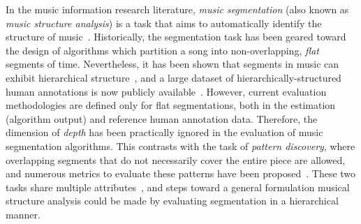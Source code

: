 \documentclass{article}
\begin{document}
In the music information research literature, \emph{music segmentation} (also known as \emph{music structure analysis}) is a task that aims to automatically identify the structure of music~\cite{Paulus2010}.
Historically, the segmentation task has been geared toward the design of algorithms which partition a song into non-overlapping, \emph{flat} segments of time.
Nevertheless, it has been shown that segments in music can exhibit hierarchical
structure~\cite{Peeters2009}, and a large dataset of hierarchically-structured human annotations is now publicly available~\cite{Smith2011}.
However, current evaluation methodologies are defined only for flat segmentations, both in the estimation (algorithm output) and reference human annotation data.
Therefore, the dimension of \emph{depth} has been practically ignored in the evaluation of music segmentation algorithms.
This contrasts with the task of \emph{pattern discovery}, where overlapping segments that do not necessarily cover the entire piece are allowed, and numerous metrics to evaluate these patterns have been proposed~\cite{Collins2013}.
These two tasks share multiple attributes~\cite{Nieto2014_Motives}, and steps toward a general formulation musical structure analysis could be made by evaluating segmentation in 
a hierarchical manner.

\end{document}
